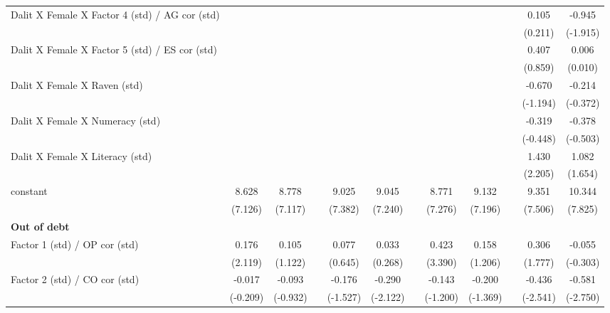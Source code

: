 {\begin{longtable}{@{\extracolsep{\fill}}lccccccccccc}
    Dalit X Female X Factor 4 (std) / AG cor (std) &       &       &       &       &       &       &       &       &       & 0.105 & -0.945 \\
          &       &       &       &       &       &       &       &       &       & (0.211) & (-1.915) \\
    Dalit X Female X Factor 5 (std) / ES cor (std) &       &       &       &       &       &       &       &       &       & 0.407 & 0.006 \\
          &       &       &       &       &       &       &       &       &       & (0.859) & (0.010) \\
    Dalit X Female X Raven (std) &       &       &       &       &       &       &       &       &       & -0.670 & -0.214 \\
          &       &       &       &       &       &       &       &       &       & (-1.194) & (-0.372) \\
    Dalit X Female X Numeracy (std) &       &       &       &       &       &       &       &       &       & -0.319 & -0.378 \\
          &       &       &       &       &       &       &       &       &       & (-0.448) & (-0.503) \\
    Dalit X Female X Literacy (std) &       &       &       &       &       &       &       &       &       & 1.430 & 1.082 \\
          &       &       &       &       &       &       &       &       &       & (2.205) & (1.654) \\
    constant & 8.628 & 8.778 &       & 9.025 & 9.045 &       & 8.771 & 9.132 &       & 9.351 & 10.344 \\
          & (7.126) & (7.117) &       & (7.382) & (7.240) &       & (7.276) & (7.196) &       & (7.506) & (7.825) \\
    \midrule
    \textbf{Out of debt} &       &       &       &       &       &       &       &       &       &       &  \\
    Factor 1 (std) / OP cor (std) & 0.176 & 0.105 &       & 0.077 & 0.033 &       & 0.423 & 0.158 &       & 0.306 & -0.055 \\
          & (2.119) & (1.122) &       & (0.645) & (0.268) &       & (3.390) & (1.206) &       & (1.777) & (-0.303) \\
    Factor 2 (std) / CO cor (std) & -0.017 & -0.093 &       & -0.176 & -0.290 &       & -0.143 & -0.200 &       & -0.436 & -0.581 \\
          & (-0.209) & (-0.932) &       & (-1.527) & (-2.122) &       & (-1.200) & (-1.369) &       & (-2.541) & (-2.750) \\

\end{longtable}}
